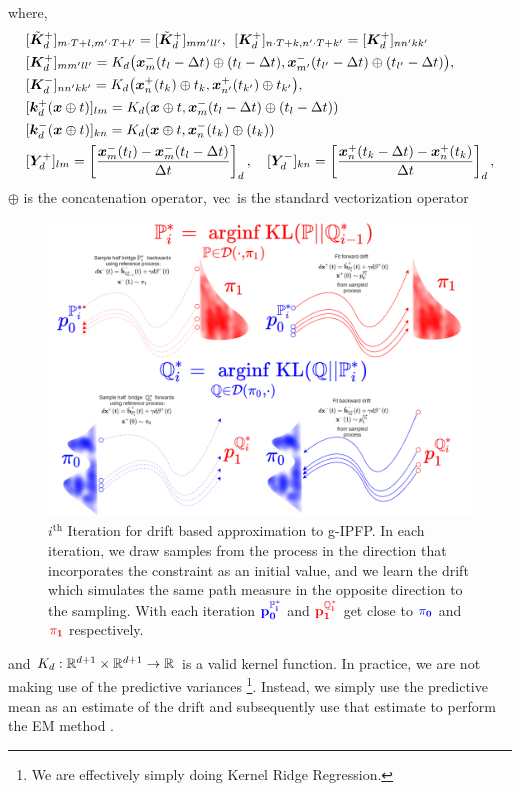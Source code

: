 \documentclass[a4paper,12pt,twoside,openright]{report}
\theoremstyle{definition}
\begin{document}
where,
\begin{align*}
   & [ \tilde{\mK}_d^{+} ]_{m\cdot T+l,m'\cdot T+l'} = [ \tilde{\mK}_d^{+} ]_{mm'll'}, \:\:  [ \mK_d^{+} ]_{n\cdot T+k,n' \cdot T +k'} = [ \mK_d^{+} ]_{nn'kk'}\\
   &[ \mK_d^{+} ]_{mm'll'} = {K}_d\big(\vx^{-}_m(t_l- \Delta t)\oplus (t_l - \Delta t), \vx^{-}_{m'}(t_{l'} - \Delta t)\oplus ( t_{l'} - \Delta t) \big), \\
   &[ \mK_d^{-} ]_{nn'kk'} = {K}_d\big(\vx^{+}_n(t_k) \oplus t_k , \vx^{+}_{n'}(t_{k'})\oplus t_{k'} \big),  \\
   &[\vk_d^{+}(\vx \oplus t)]_{lm} = K_d(\vx \oplus t , \vx^{-}_m(t_l- \Delta t)\oplus (t_l - \Delta t))\\
   &[\vk_d^{-}(\vx \oplus t)]_{kn} = K_d(\vx \oplus t , \vx^{-}_n(t_k)\oplus (t_k))\\
   &[\mY_d^{+}]_{lm} =  \left[\frac{\vx^{-}_m(t_l) - \vx^{-}_m(t_l - \Delta t)}{\Delta t}\right]_d, \quad [\mY_d^{-}]_{kn} =  \left[\frac{\vx^{+}_n(t_k - \Delta t)  - \vx^{+}_n(t_k)}{\Delta t} \right]_d,
\end{align*}
 $\oplus$ is the concatenation operator, $\vec$ is the standard vectorization operator 
\begin{landscape}
\begin{figure}
    \vspace{-2cm}
    \includegraphics[scale=0.7]{images/gp_IPFP.PNG}
    \caption{$i^{\text{th}}$ Iteration for drift based approximation to g-IPFP. In each iteration, we draw samples from the process in the direction that incorporates the constraint as an initial value, and we learn the drift which simulates the same path measure in the opposite direction to the sampling. With each iteration $\mathbf{\color{blue}{p^{\P^{*}_i}_0}}$ and $\mathbf{\color{red}{p^{\Q^{*}_i}_1}}$ get close to $\mathbf{\color{blue}{\pi_0}}$ and $\mathbf{\color{red}{\pi_1}}$ respectively.}
    \label{fig:gp_drift}
\end{figure}
\end{landscape}
and $K_d: \R^{d+1} \times \R^{d+1} \rightarrow \R$ is a valid kernel function. In practice, we are not making use of the predictive variances \footnote{We are effectively simply doing Kernel Ridge Regression.}. Instead, we simply use the predictive mean as an estimate of the drift and subsequently use that estimate to perform the EM method .
\end{document}
